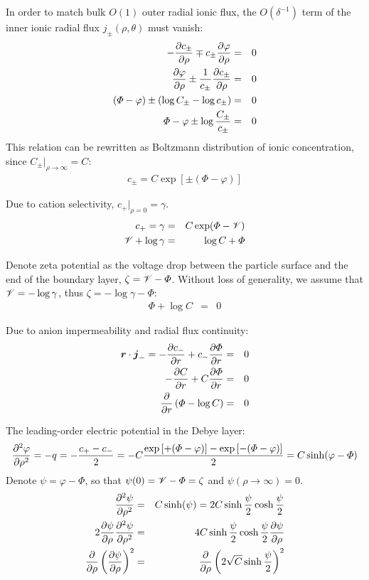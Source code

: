 In order to match bulk $O(1)$ outer radial ionic flux, 
the $O(\delta^{-1})$ term of the inner ionic radial flux $j_\pm(\rho, \theta)$ must vanish:
\begin{eqnarray}
  -\frac{\partial c_\pm}{\partial \rho} \mp c_\pm \frac{\partial \varphi}{\partial \rho} &=& 0 \\
  \frac{\partial \varphi}{\partial \rho} \pm\frac{1}{c_\pm}\frac{\partial c_\pm}{\partial \rho} &=& 0 \\
  \left(\varPhi - \varphi\right) \pm\left(\log C_\pm - \log c_\pm\right) &=& 0 \\
  \varPhi - \varphi \pm \log \frac{C_\pm}{c_\pm} &=& 0
\end{eqnarray}
This relation can be rewritten as Boltzmann distribution of ionic concentration,
since $C_\pm|_{\rho\rightarrow\infty} = C$:
\begin{eqnarray}
c_\pm = C \exp\left[\pm(\varPhi - \varphi)\right]
\end{eqnarray}

Due to cation selectivity, $c_+|_{\rho=0} = \gamma$.
\begin{eqnarray}
  c_+ = \gamma &=& C \exp(\varPhi - \mathscr{V}) \\
  \mathscr{V} + \log \gamma &=& \log C + \varPhi
\end{eqnarray}

Denote zeta potential as the voltage drop between the particle surface and the end of
the boundary layer, $\zeta = \mathscr{V} - \varPhi$. 
Without loss of generality, 
we assume that $\mathscr{V} = -\log\gamma$, thus $\zeta = -\log\gamma-\varPhi$:
\begin{eqnarray}
\varPhi + \log C &=& 0
\end{eqnarray}

Due to anion impermeability and radial flux continuity:
\begin{eqnarray}
  \boldsymbol{r} \cdot \boldsymbol{j}_- = -\frac{\partial c_-}{\partial r} + c_- \frac{\partial \varPhi}{\partial r} &=& 0 \\
-\frac{\partial C}{\partial r} + C \frac{\partial \varPhi}{\partial r} &=& 0 \\
\frac{\partial }{\partial r}\left(\varPhi - \log C\right) &=& 0
\end{eqnarray}

The leading-order electric potential in the Debye layer:
\begin{eqnarray}  
\frac{\partial ^2 \varphi}{\partial \rho^2} = -q = -\frac{c_+ - c_-}{2} = 
-C\frac{\exp\left[+(\varPhi - \varphi)\right] - \exp\left[-(\varPhi - \varphi)\right]}{2} = 
C \sinh(\varphi - \varPhi)
\end{eqnarray}
Denote $\psi = \varphi - \varPhi$, so that $\psi(0) = \mathscr{V} - \varPhi = \zeta$ and 
$\psi(\rho\rightarrow\infty) = 0$.
\begin{eqnarray}  
\frac{\partial ^2 \psi}{\partial \rho^2} &=& C \sinh(\psi) = 2 C \sinh{\frac{\psi}{2}}\cosh{\frac{\psi}{2}} 
\\
2\frac{\partial \psi}{\partial \rho} \frac{\partial ^2 \psi}{\partial \rho^2} &=& 
4 C \sinh{\frac{\psi}{2}}\cosh{\frac{\psi}{2}} \frac{\partial \psi}{\partial \rho} 
\\
\frac{\partial }{\partial \rho} \left(\frac{\partial \psi}{\partial \rho}\right)^2 &=& 
\frac{\partial }{\partial \rho} \left(2 \sqrt{C} \sinh{\frac{\psi}{2}}\right)^2 
\end{eqnarray}

